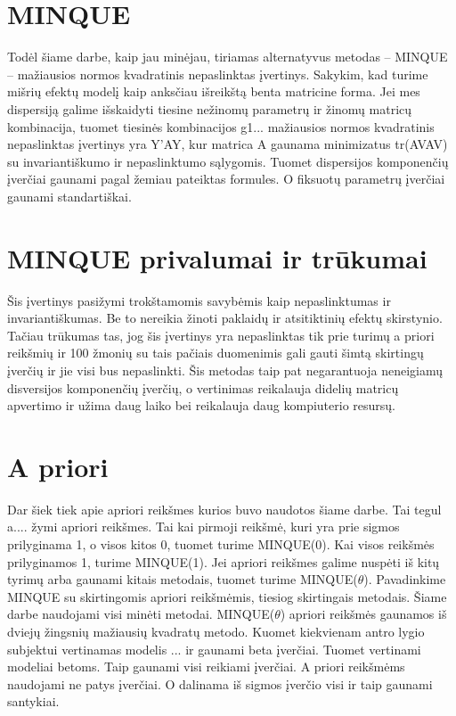 \documentclass[12pt,a4paper]{article}
\begin{document}
\section*{MINQUE}
Todėl šiame darbe, kaip jau minėjau, tiriamas alternatyvus metodas -- MINQUE -- mažiausios normos kvadratinis nepaslinktas įvertinys. Sakykim, kad turime mišrių efektų modelį kaip anksčiau išreikštą benta matricine forma. Jei mes dispersiją galime išskaidyti tiesine nežinomų parametrų ir žinomų matricų kombinacija, tuomet tiesinės  kombinacijos g1... mažiausios normos kvadratinis nepaslinktas įvertinys yra  Y'AY, kur matrica A gaunama minimizatus tr(AVAV) su invariantiškumo ir nepaslinktumo sąlygomis. Tuomet dispersijos komponenčių įverčiai gaunami pagal žemiau pateiktas formules. O fiksuotų parametrų įverčiai gaunami standartiškai.


\section*{MINQUE privalumai ir trūkumai}
Šis įvertinys pasižymi trokštamomis savybėmis kaip nepaslinktumas ir invariantiškumas. Be to nereikia žinoti paklaidų ir atsitiktinių efektų skirstynio. Tačiau trūkumas tas, jog šis įvertinys yra nepaslinktas tik prie turimų a priori reikšmių ir 100 žmonių su tais pačiais duomenimis gali gauti šimtą skirtingų įverčių ir jie visi bus nepaslinkti. Šis metodas taip pat negarantuoja neneigiamų disversijos komponenčių įverčių, o vertinimas reikalauja didelių matricų apvertimo ir užima daug laiko bei reikalauja daug kompiuterio resursų.

\section*{A priori}
Dar šiek tiek apie apriori reikšmes kurios buvo naudotos šiame darbe. Tai tegul a.... žymi apriori reikšmes. Tai kai pirmoji reikšmė, kuri yra prie sigmos prilyginama 1, o visos kitos 0, tuomet turime MINQUE(0). Kai visos reikšmės prilyginamos 1, turime MINQUE(1). Jei apriori reikšmes galime nuspėti iš kitų tyrimų arba gaunami kitais metodais, tuomet turime MINQUE($\theta$). Pavadinkime MINQUE su skirtingomis apriori reikšmėmis, tiesiog skirtingais metodais. Šiame darbe naudojami visi minėti metodai. MINQUE($\theta$) apriori reikšmės gaunamos iš dviejų žingsnių mažiausių kvadratų metodo. Kuomet kiekvienam antro lygio subjektui vertinamas modelis ... ir gaunami beta įverčiai. Tuomet vertinami modeliai betoms. Taip gaunami visi reikiami įverčiai. A priori reikšmėms naudojami ne patys įverčiai. O dalinama iš sigmos įverčio visi ir taip gaunami santykiai.
\end{document}
